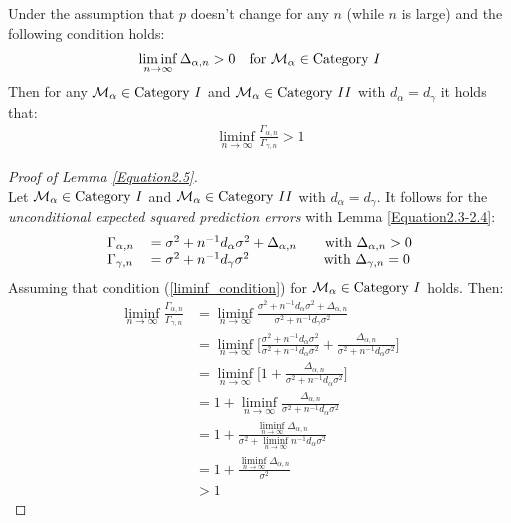 \documentclass[Research_Module_ES.tex]{subfiles}
\begin{document}
\begin{lemma}
	\label{Equation2.5}
	Under the assumption that $p$ doesn't change for any $n$ (while $n$ is large) and the following condition holds:
	\begin{align}
		\liminf_{n\rightarrow\infty}\Delta_{\alpha,n}>0 \text{~~~for~}\mathcal{M}_\alpha\in\text{Category}~\RM{1} \label{liminf_condition}
	\end{align}
	Then for any $\mathcal{M}_\alpha\in\text{Category}~\RM{1}$ and $\mathcal{M}_\alpha\in\text{Category}~\RM{2}$ with $d_\alpha=d_\gamma$ it holds that:
	\begin{align*}
		\liminf_{n\rightarrow\infty}\frac{\Gamma_{\alpha,n}}{\Gamma_{\gamma,n}}>1
	\end{align*}
\end{lemma}

\begin{proof}[Proof of Lemma \ref{Equation2.5}]~\\
	Let $\mathcal{M}_\alpha\in\text{Category}~\RM{1}$ and $\mathcal{M}_\alpha\in\text{Category}~\RM{2}$ with $d_\alpha=d_\gamma$. It follows for the \textit{unconditional expected squared prediction errors} with Lemma \ref{Equation2.3-2.4}:
	\begin{align*}
	\begin{tabular}{ll}
	$\Gamma_{\alpha,n}$&$=\sigma^2+n^{-1}d_\alpha\sigma^2+\Delta_{\alpha,n}~~~~~$ with $\Delta_{\alpha,n}>0$\\
	$\Gamma_{\gamma,n}$&$=\sigma^2+n^{-1}d_\gamma\sigma^2~~~~~~~~~~~~~~~~$with $\Delta_{\gamma,n}=0$
	\end{tabular}
	\end{align*}
	Assuming that condition (\ref{liminf_condition}) for $\mathcal{M}_\alpha\in\text{Category}~\RM{1}$ holds. Then:
	\begin{align*}
	\liminf_{n\rightarrow\infty}\frac{\Gamma_{\alpha,n}}{\Gamma_{\gamma,n}}&=\liminf_{n\rightarrow\infty}\frac{\sigma^2+n^{-1}d_\alpha\sigma^2+\Delta_{\alpha,n}}{\sigma^2+n^{-1}d_\gamma\sigma^2}	\\
	&=\liminf_{n\rightarrow\infty}\Big[\frac{\sigma^2+n^{-1}d_\alpha\sigma^2}{\sigma^2+n^{-1}d_\alpha\sigma^2}+\frac{\Delta_{\alpha,n}}{\sigma^2+n^{-1}d_\alpha\sigma^2}\Big]\\
	&=\liminf_{n\rightarrow\infty}\Big[1+\frac{\Delta_{\alpha,n}}{\sigma^2+n^{-1}d_\alpha\sigma^2}\Big]\\
	&=1+\liminf_{n\rightarrow\infty}\frac{\Delta_{\alpha,n}}{\sigma^2+n^{-1}d_\alpha\sigma^2}\\
	&=1+\frac{\liminf_{n\rightarrow\infty}\Delta_{\alpha,n}}{\sigma^2+ \liminf_{n\rightarrow\infty} n^{-1}d_\alpha\sigma^2}\\
	&=1+\frac{\liminf_{n\rightarrow\infty}\Delta_{\alpha,n}}{\sigma^2}\\
	&>1
	\end{align*}
\end{proof}
\end{document}
